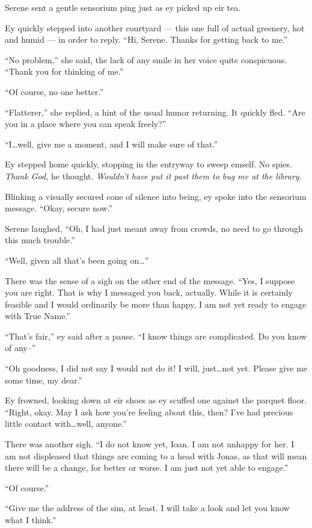 Serene sent a gentle sensorium ping just as ey picked up eir tea.

Ey quickly stepped into another courtyard — this one full of actual greenery, hot and humid — in order to reply. ``Hi, Serene. Thanks for getting back to me.''

``No problem,'' she said, the lack of any smile in her voice quite conspicuous. ``Thank you for thinking of me.''

``Of course, no one better.''

``Flatterer,'' she replied, a hint of the usual humor returning. It quickly fled. ``Are you in a place where you can speak freely?''

``I\ldots well, give me a moment, and I will make sure of that.''

Ey stepped home quickly, stopping in the entryway to sweep emself. No spies. \emph{Thank God,} he thought. \emph{Wouldn't have put it past them to bug me at the library.}

Blinking a visually secured cone of silence into being, ey spoke into the sensorium message. ``Okay, secure now.''

Serene laughed, ``Oh, I had just meant away from crowds, no need to go through this much trouble.''

``Well, given all that's been going on\ldots{}''

There was the sense of a sigh on the other end of the message. ``Yes, I suppose you are right. That is why I messaged you back, actually. While it is certainly feasible and I would ordinarily be more than happy, I am not yet ready to engage with True Name.''

``That's fair,'' ey said after a pause. ``I know things are complicated. Do you know of any--''

``Oh goodness, I did not say I would not do it! I will, just\ldots not yet. Please give me some time, my dear.''

Ey frowned, looking down at eir shoes as ey scuffed one against the parquet floor. ``Right, okay. May I ask how you're feeling about this, then? I've had precious little contact with\ldots well, anyone.''

There was another sigh. ``I do not know yet, Ioan. I am not unhappy for her. I am not displeased that things are coming to a head with Jonas, as that will mean there will be a change, for better or worse. I am just not yet able to engage.''

``Of course.''

``Give me the address of the sim, at least. I will take a look and let you know what I think.''

